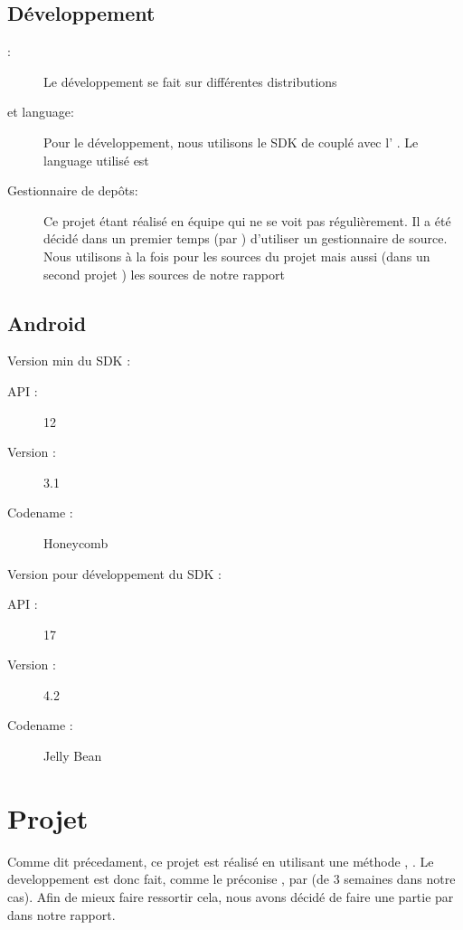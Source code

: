 \documentclass[french]{report}
\begin{document}
\section{Développement}
\begin{description}
\item[\os{}: ] Le développement se fait sur différentes distributions \linux{}
\item[\ide{} et language: ] Pour le développement, nous utilisons le SDK de \android{} couplé avec l'\ide{} \eclipse{}. Le language utilisé est \java{}
\item[Gestionnaire de depôts: ] Ce projet étant réalisé en équipe qui ne se voit pas régulièrement. Il a été décidé dans un premier temps (par \responsableProjet{}) d'utiliser un gestionnaire de source. Nous utilisons \github{} à la fois pour les sources du projet mais aussi (dans un second projet \github{}) les sources de notre rapport
\end{description}
\section{Android}
Version min du SDK :
\begin{description}
\item[API : ] 12
\item[Version : ] 3.1 
\item[Codename : ] Honeycomb 
\end{description}

Version pour développement du SDK :
\begin{description}
\item[API : ] 17
\item[Version : ] 4.2 
\item[Codename : ] Jelly Bean
\end{description}


\chapter{Projet}
Comme dit précedament, ce projet est réalisé en utilisant une méthode \agile{}, \scrum{}. Le developpement est donc fait, comme le préconise \scrum{}, par \sprint{} (de 3 semaines dans notre cas). Afin de mieux faire ressortir cela, nous avons décidé de faire une partie par \sprint{} dans notre rapport.
\end{document}
